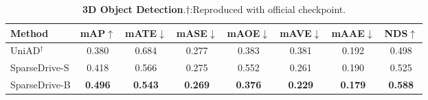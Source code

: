 \begin{table}[htbp]
\centering
\resizebox{0.6\linewidth}{!}
{
\begin{tabular}{l|c|ccccc|c}
\toprule
Method & mAP$\uparrow$ & mATE$\downarrow$ & mASE$\downarrow$ & mAOE$\downarrow$ & mAVE$\downarrow$ & mAAE$\downarrow$ & \cellcolor{gray!30}NDS$\uparrow$ \\
\midrule
UniAD$^\dagger$ & 0.380 & 0.684 & 0.277 & 0.383 & 0.381 & 0.192 & \cellcolor{gray!30}0.498 \\
SparseDrive-S & 0.418 & 0.566 & 0.275 & 0.552 & 0.261 & 0.190 & \cellcolor{gray!30}0.525 \\
SparseDrive-B & \textbf{0.496} & \textbf{0.543} & \textbf{0.269} & \textbf{0.376} & \textbf{0.229} & \textbf{0.179} & \cellcolor{gray!30}\textbf{0.588} \\
\bottomrule
\end{tabular}
}
\vspace{5pt}
\caption{\textbf{3D Object Detection}.$\dagger$:Reproduced with official checkpoint.}
\label{tab:detection}
\end{table} 